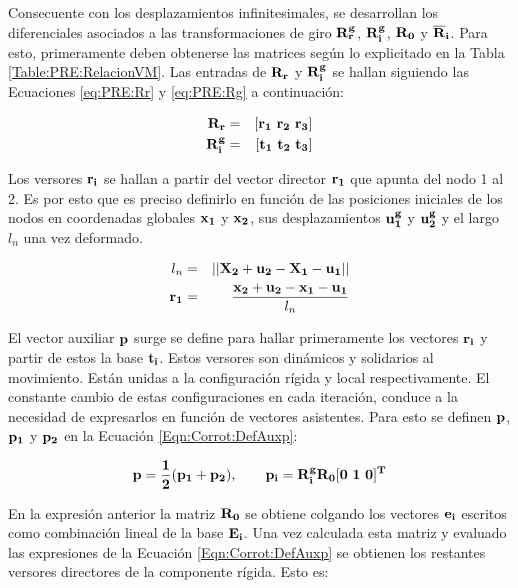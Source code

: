 Consecuente con los desplazamientos infinitesimales, se desarrollan los diferenciales asociados a las transformaciones de giro $\bf{R_r^g}$, $\bf{R_i^g}$, $\bf{R_0}$ y $\bf{\overline{R}}_i$.
Para esto, primeramente deben obtenerse las matrices según lo explicitado en la Tabla \ref{Table:PRE:RelacionVM}. Las entradas de $\bf{R}_r$ y  $\bf{R}_i^g$ se hallan siguiendo las Ecuaciones \eqref{eq:PRE:Rr} y \eqref{eq:PRE:Rg} a continuación:

\begin{eqnarray}
	\label{eq:PRE:Rr}
	\bf{R_r}&=&[\bf{r_1} ~ \bf{r_2} ~ \bf{r_3}]\\
	\label{eq:PRE:Rg}
	\bf{R}_i^g&=&[\bf{t_1} ~ \bf{t_2} ~ \bf{t_3}]
\end{eqnarray}

 Los versores $\bf{r_i}$  se hallan a partir del vector director $\bf{r_1}$ que apunta del nodo 1 al 2. Es por esto que es preciso definirlo en función de las posiciones iniciales de los nodos en coordenadas globales $\bf{x}_1$ y $\bf{x}_2$, sus desplazamientos $\bf{u}_1^g$ y $\bf{u}_2^g$ y el largo $l_n$ una vez deformado.

\begin{eqnarray}
	l_n&=& ||\bf{X}_2+\bf{u}_2-\bf{X}_1-\bf{u}_1||\\
	\bf{r_1}&=&\frac{\bf{x}_2+\bf{u}_2-\bf{x}_1-\bf{u}_1}{l_n}
\end{eqnarray}

El vector auxiliar $\bf{p}$ surge se define para hallar primeramente los vectores $\bf{r}_i$ y partir de estos la base $\bf{t}_i$. Estos versores son dinámicos y solidarios al movimiento. Están unidas a la configuración rígida y local respectivamente. El constante cambio de estas configuraciones en cada iteración, conduce a la necesidad de expresarlos en función de vectores asistentes.  Para esto se definen 
$\bf{p}$, $\bf{p_1}$ y $\bf{p_2}$ en la Ecuación \eqref{Eqn:Corrot:DefAuxp}:

\begin{equation}\label{Eqn:Corrot:DefAuxp}
	\bf{p}=\frac{1}{2}(\bf{p}_1+\bf{p}_2),~~~~~~\bf{p_i}=\bf{R}_i^g\bf{R}_0[0~1~0]^T
\end{equation}

En la expresión anterior la matriz $\bf{R}_0$ se obtiene colgando los vectores $\bf{e}_i$ escritos como combinación lineal de la base $\bf{E_i}$. Una vez calculada esta matriz y evaluado las expresiones de la Ecuación \eqref{Eqn:Corrot:DefAuxp} se obtienen los restantes versores directores 
de la componente rígida. Esto es:


